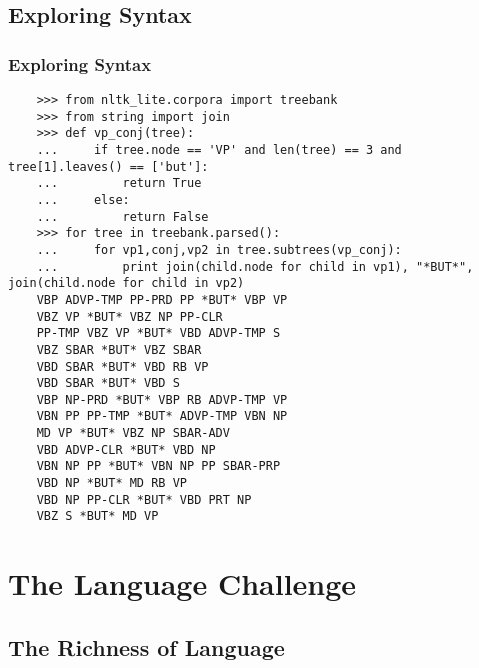 \documentclass[presentation]{beamer}
\begin{document}
\subsection{Exploring Syntax}
\begin{frame}[fragile]
  \frametitle{Exploring Syntax}
  \scriptsize
\begin{verbatim}
    >>> from nltk_lite.corpora import treebank
    >>> from string import join
    >>> def vp_conj(tree):
    ...     if tree.node == 'VP' and len(tree) == 3 and tree[1].leaves() == ['but']:
    ...         return True
    ...     else:
    ...         return False
    >>> for tree in treebank.parsed():
    ...     for vp1,conj,vp2 in tree.subtrees(vp_conj):
    ...         print join(child.node for child in vp1), "*BUT*", join(child.node for child in vp2)
    VBP ADVP-TMP PP-PRD PP *BUT* VBP VP
    VBZ VP *BUT* VBZ NP PP-CLR
    PP-TMP VBZ VP *BUT* VBD ADVP-TMP S
    VBZ SBAR *BUT* VBZ SBAR
    VBD SBAR *BUT* VBD RB VP
    VBD SBAR *BUT* VBD S
    VBP NP-PRD *BUT* VBP RB ADVP-TMP VP
    VBN PP PP-TMP *BUT* ADVP-TMP VBN NP
    MD VP *BUT* VBZ NP SBAR-ADV
    VBD ADVP-CLR *BUT* VBD NP
    VBN NP PP *BUT* VBN NP PP SBAR-PRP
    VBD NP *BUT* MD RB VP
    VBD NP PP-CLR *BUT* VBD PRT NP
    VBZ S *BUT* MD VP
\end{verbatim}
\end{frame}

\section{The Language Challenge}

\subsection{The Richness of Language}
\end{document}
